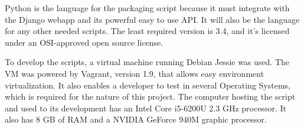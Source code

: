 Python is the language for the packaging script because it must integrate with the Django webapp and its powerful easy to use API. It will also be the language for any other needed scripts. The least required version is 3.4, and it's licensed under an OSI-approved open source license.

To develop the scripts, a virtual machine running Debian Jessie was used. The VM was powered by Vagrant, version 1.9, that allows easy environment virtualization. It also enables a developer to test in several Operating Systems, which is required for the nature of this project. The computer hosting the script and used to its development has an Intel Core i5-6200U 2.3 GHz processor. It also has 8 GB of RAM and a NVIDIA GeForce 940M graphic processor.
